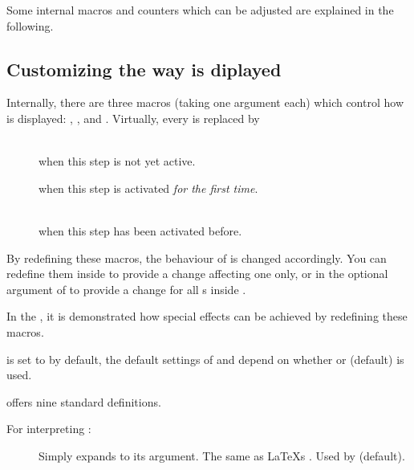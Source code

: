 \begin{slide}
  Some internal macros and counters which can be adjusted are explained in the following.

  \newslide

  \subsection{Customizing the way  is diplayed}\label{Sec:displaycustom}%
  Internally, there are three macros (taking one argument each) which control how  is displayed:
  ,
  , and
  . Virtually, every
   is replaced by
  \begin{description}
  \item[]\mbox{}\\ when this step is not yet active.
  \item[] when this step is
    activated \emph{for the first time}.
  \item[]\mbox{}\\
    when this step has been activated before.
  \end{description}

  By redefining these macros, the behaviour of  is changed accordingly. You can redefine them inside
   to provide a change affecting one  only, or in the optional argument of
   to provide a change for all s inside .

  In the , it is demonstrated how special effects can be achieved by redefining these macros.

   is set to  by default, the default settings of
   and  depend on whether  or
   (default) is used.

  \newslide

   offers nine standard definitions.

  For interpreting :
  \begin{description}
  \item[]
    Simply expands to its argument. The same as \LaTeX s
    . Used by  (default).


\end{description}
\end{slide}
